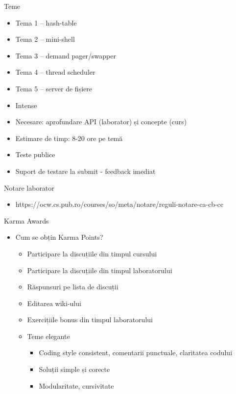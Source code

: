 \documentclass{so.cs.pub.ro}
\begin{document}
\begin{frame}{Teme}
  	\begin{itemize}   
    		\item Tema 1 – hash-table
		\item Tema 2 – mini-shell
		\item Tema 3 – demand pager/swapper
		\item Tema 4 – thread scheduler
		\item Tema 5 – server de fișiere
		\vspace*{0.2cm}
		\item Intense
		\item Necesare: aprofundare API (laborator) și concepte (curs)
		\item Estimare de timp: 8-20 ore pe temă
		\item Teste publice
		\item Suport de testare la submit - feedback imediat
    	\end{itemize}		
\end{frame}

\begin{frame}{Notare laborator}
  	\begin{itemize}
        \item https://ocw.cs.pub.ro/courses/so/meta/notare/reguli-notare-ca-cb-cc
	\end{itemize}
\end{frame}

\begin{frame}{Karma Awards}
  	\begin{itemize}   
    		\item Cum se obțin Karma Points?
		\begin{itemize}
			\item Participare la discuțiile din timpul cursului
			\item Participare la discuțiile din timpul laboratorului
			\item Răspunsuri pe lista de discuții
			\item Editarea wiki-ului
			\item Exercițiile bonus din timpul laboratorului
			\item Teme elegante
			\begin{itemize}
				\item Coding style consistent, comentarii punctuale, claritatea codului
				\item Soluții simple și corecte
				\item Modularitate, cursivitate 
			\end{itemize}
		\end{itemize}
    	\end{itemize}		
\end{frame}
\end{document}
